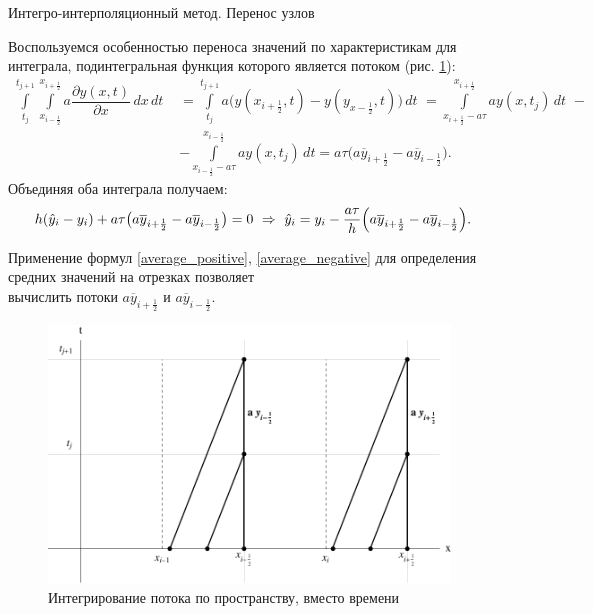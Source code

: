 \documentclass[unicode, 8pt]{beamer}
\newcommand{\picref}[1]{рис. \ref{#1}}
\newcommand{\half}{\frac{1}{2}}
\begin{document}
    \begin{frame}{Интегро-интерполяционный метод. Перенос узлов}
        \begin{block}{}
            Воспользуемся особенностью переноса значений по характеристикам для интеграла, подинтегральная функция которого является потоком (\picref{fig:flow_visual}):
            \[
                \begin{split}
                    \int \limits_{t_j}^{t_{j+1}} \int \limits_{x_{i-\half}}^{x_{i+\half}} a \dfrac{ \partial y(x,t) }{ \partial x } \, dx \, dt \,\, &= \int \limits_{t_j}^{t_{j+1}} a \bigl( y(x_{i+\half}, t) - y(y_{x-\half}, t) \bigr) \, dt \,\, =  \int \limits_{x_{i+\half}-a\tau}^{x_{i+\half}} a y(x, t_j) \, dt \,\, - \\
                    &- \int \limits_{x_{i-\half}-a\tau}^{x_{i-\half}} a y(x, t_j) \, dt = a\tau\bigl( a \overline y_{i+\half} - a \overline y_{i-\half} \bigr).
                \end{split}
            \]
            Объединяя оба интеграла получаем:
            \begin{equation}
                \begin{split}
                    h ( \hat y_i - y_i) &+ a\tau\bigl( a \overline y_{i+\half} - a \overline y_{i-\half} \bigr) = 0 \,\, \Rightarrow \,\, \hat y_i = y_i - \dfrac{ a\tau }{ h } \Bigl( a \overline y_{i+\half} - a \overline y_{i-\half} \Bigr).
                \end{split}
                \label{center}
            \end{equation}

            Применение формул \eqref{average_positive}, \eqref{average_negative} для определения средних значений на отрезках позволяет \\[0.3em] вычислить потоки  $ a \overline y_{i+\half} $ и $  a \overline y_{i-\half} $.
        \end{block}
    \end{frame}

    \begin{frame}
        \begin{figure}[h]
            \centering
            \includegraphics[width=0.95\textwidth]{flow_visual.pdf}
            \caption{Интегрирование потока по пространству, вместо времени}
            \label{fig:flow_visual}
        \end{figure}
    \end{frame}
\end{document}
